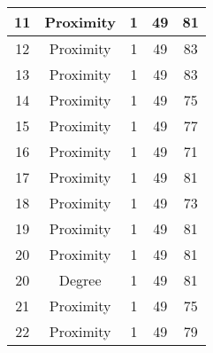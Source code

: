 \documentclass[results.tex]{subfiles}
\begin{document}
\begin{center}
\begin{tabular}{| c || c | c | c | c |}
            \hline
            11                      & Proximity                    & 1                      & 49                      & 81                   \\
            \hline
            12                      & Proximity                    & 1                      & 49                      & 83                   \\
            \hline
            13                      & Proximity                    & 1                      & 49                      & 83                   \\
            \hline
            14                      & Proximity                    & 1                      & 49                      & 75                   \\
            \hline
            15                      & Proximity                    & 1                      & 49                      & 77                   \\
            \hline
            16                      & Proximity                    & 1                      & 49                      & 71                   \\
            \hline
            17                      & Proximity                    & 1                      & 49                      & 81                   \\
            \hline
            18                      & Proximity                    & 1                      & 49                      & 73                   \\
            \hline
            19                      & Proximity                    & 1                      & 49                      & 81                   \\
            \hline
            20                      & Proximity                    & 1                      & 49                      & 81                   \\
            \hline
            20                      & Degree                       & 1                      & 49                      & 81                   \\
            \hline
            21                      & Proximity                    & 1                      & 49                      & 75                   \\
            \hline
            22                      & Proximity                    & 1                      & 49                      & 79                   \\

\end{tabular}
\end{center}
\end{document}
